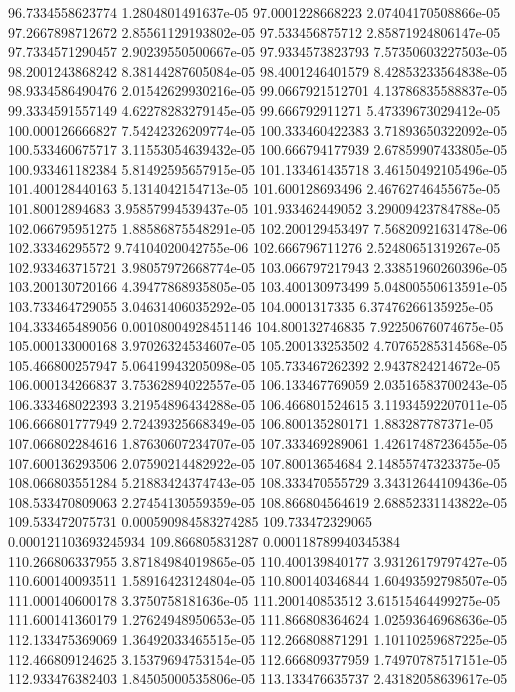 {96.7334558623774 1.2804801491637e-05
97.0001228668223 2.07404170508866e-05
97.2667898712672 2.85561129193802e-05
97.533456875712 2.85871924806147e-05
97.7334571290457 2.90239550500667e-05
97.9334573823793 7.57350603227503e-05
98.2001243868242 8.38144287605084e-05
98.4001246401579 8.42853233564838e-05
98.9334586490476 2.01542629930216e-05
99.0667921512701 4.13786835588837e-05
99.3334591557149 4.62278283279145e-05
99.666792911271 5.47339673029412e-05
100.000126666827 7.54242326209774e-05
100.333460422383 3.71893650322092e-05
100.533460675717 3.11553054639432e-05
100.666794177939 2.67859907433805e-05
100.933461182384 5.81492595657915e-05
101.133461435718 3.46150492105496e-05
101.400128440163 5.1314042154713e-05
101.600128693496 2.46762746455675e-05
101.80012894683 3.95857994539437e-05
101.933462449052 3.29009423784788e-05
102.066795951275 1.88586875548291e-05
102.200129453497 7.56820921631478e-06
102.33346295572 9.74104020042755e-06
102.666796711276 2.52480651319267e-05
102.933463715721 3.98057972668774e-05
103.066797217943 2.33851960260396e-05
103.200130720166 4.39477868935805e-05
103.400130973499 5.04800550613591e-05
103.733464729055 3.04631406035292e-05
104.0001317335 6.37476266135925e-05
104.333465489056 0.00108004928451146
104.800132746835 7.92250676074675e-05
105.000133000168 3.97026324534607e-05
105.200133253502 4.70765285314568e-05
105.466800257947 5.06419943205098e-05
105.733467262392 2.9437824214672e-05
106.000134266837 3.75362894022557e-05
106.133467769059 2.03516583700243e-05
106.333468022393 3.21954896434288e-05
106.466801524615 3.11934592207011e-05
106.666801777949 2.72439325668349e-05
106.800135280171 1.883287787371e-05
107.066802284616 1.87630607234707e-05
107.333469289061 1.42617487236455e-05
107.600136293506 2.07590214482922e-05
107.80013654684 2.14855747323375e-05
108.066803551284 5.21883424374743e-05
108.333470555729 3.34312644109436e-05
108.533470809063 2.27454130559359e-05
108.866804564619 2.68852331143822e-05
109.533472075731 0.000590984583274285
109.733472329065 0.000121103693245934
109.866805831287 0.000118789940345384
110.266806337955 3.87184984019865e-05
110.400139840177 3.93126179797427e-05
110.600140093511 1.58916423124804e-05
110.800140346844 1.60493592798507e-05
111.000140600178 3.3750758181636e-05
111.200140853512 3.61515464499275e-05
111.600141360179 1.27624948950653e-05
111.866808364624 1.02593646968636e-05
112.133475369069 1.36492033465515e-05
112.266808871291 1.10110259687225e-05
112.466809124625 3.15379694753154e-05
112.666809377959 1.74970787517151e-05
112.933476382403 1.84505000535806e-05
113.133476635737 2.43182058639617e-05
}
